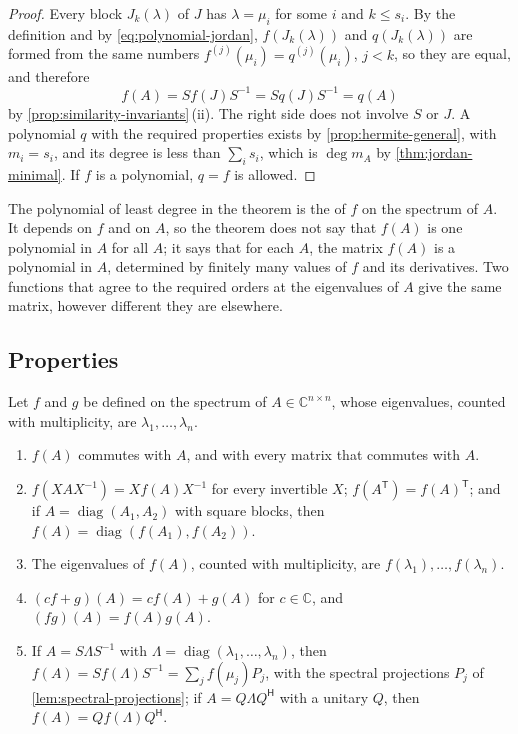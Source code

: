 \begin{proof}
Every block $J_k(\lambda)$ of $J$ has $\lambda=\mu_i$ for some $i$ and $k\le s_i$. By the definition and by \eqref{eq:polynomial-jordan}, $f(J_k(\lambda))$ and $q(J_k(\lambda))$ are formed from the same numbers $f^{(j)}(\mu_i)=q^{(j)}(\mu_i)$, $j<k$, so they are equal, and therefore
\[
f(A)=Sf(J)S^{-1}=Sq(J)S^{-1}=q(A)
\]
by \cref{prop:similarity-invariants}\,(ii). The right side does not involve $S$ or $J$. A polynomial $q$ with the required properties exists by \cref{prop:hermite-general}, with $m_i=s_i$, and its degree is less than $\sum_is_i$, which is $\deg m_A$ by \cref{thm:jordan-minimal}. If $f$ is a polynomial, $q=f$ is allowed.
\end{proof}

The polynomial of least degree in the theorem is the  of $f$ on the spectrum of $A$. It depends on $f$ and on $A$, so the theorem does not say that $f(A)$ is one polynomial in $A$ for all $A$; it says that for each $A$, the matrix $f(A)$ is a polynomial in $A$, determined by finitely many values of $f$ and its derivatives. Two functions that agree to the required orders at the eigenvalues of $A$ give the same matrix, however different they are elsewhere.

\subsection{Properties}

\begin{theorem}
\label{thm:function-properties}
Let $f$ and $g$ be defined on the spectrum of $A\in\mathbb C^{n\times n}$, whose eigenvalues, counted with multiplicity, are $\lambda_1,\ldots,\lambda_n$.
\begin{enumerate}
\item $f(A)$ commutes with $A$, and with every matrix that commutes with $A$.
\item $f(XAX^{-1})=Xf(A)X^{-1}$ for every invertible $X$; $f(A^{\mathsf T})=f(A)^{\mathsf T}$; and if $A=\operatorname{diag}(A_1,A_2)$ with square blocks, then $f(A)=\operatorname{diag}(f(A_1),f(A_2))$.
\item The eigenvalues of $f(A)$, counted with multiplicity, are $f(\lambda_1),\ldots,f(\lambda_n)$.
\item $(cf+g)(A)=cf(A)+g(A)$ for $c\in\mathbb C$, and $(fg)(A)=f(A)g(A)$.
\item If $A=S\Lambda S^{-1}$ with $\Lambda=\operatorname{diag}(\lambda_1,\ldots,\lambda_n)$, then $f(A)=Sf(\Lambda)S^{-1}=\sum_jf(\mu_j)P_j$, with the spectral projections $P_j$ of \cref{lem:spectral-projections}; if $A=Q\Lambda Q^{\mathsf H}$ with a unitary $Q$, then $f(A)=Qf(\Lambda)Q^{\mathsf H}$.
\end{enumerate}
\end{theorem}


